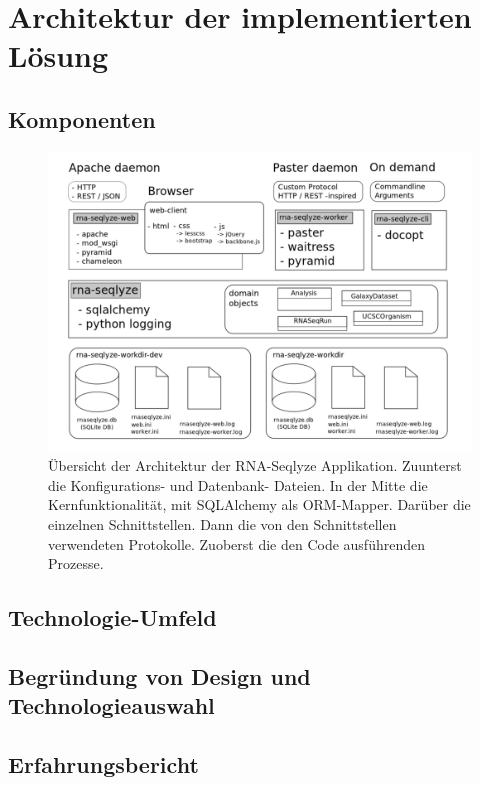 \documentclass[a4paper]{thesis}
\begin{document}
\section{Architektur der implementierten Lösung}

\subsection{Komponenten}

\begin{figure}[h]
\includegraphics{img/overview_architektur}
\caption[Applikationsarchitektur]{
	Übersicht der Architektur der RNA-Seqlyze Applikation.
	Zuunterst die Konfigurations- und Datenbank- Dateien.
	In der Mitte die Kernfunktionalität, mit SQLAlchemy
	als ORM-Mapper. Darüber die einzelnen Schnittstellen.
	Dann die von den Schnittstellen verwendeten Protokolle.
	Zuoberst die den Code ausführenden Prozesse.
}
\label{fig:arch}
\end{figure}

\subsection{Technologie-Umfeld}

\subsection{Begründung von Design und Technologieauswahl}

\subsection{Erfahrungsbericht}
\end{document}
